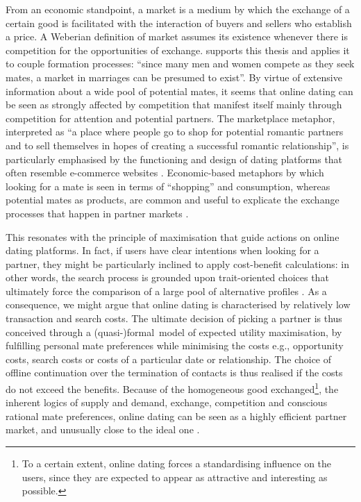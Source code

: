 From an economic standpoint, a market is a medium by which the exchange
of a certain good is facilitated with the interaction of buyers and
sellers who establish a price. A Weberian definition of market assumes
its existence whenever there is competition for the opportunities
of exchange. \citet{Becker1974A-Theory-of-Mar} supports this thesis
and applies it to couple formation processes: \textquotedblleft since
many men and women compete as they seek mates, a market in marriages
can be presumed to exist\textquotedblright . By virtue of extensive
information about a wide pool of potential mates, it seems that online
dating can be seen as strongly affected by competition that manifest
itself mainly through competition for attention and potential partners.
The marketplace metaphor, interpreted as \textquotedblleft a place
where people go to shop for potential romantic partners and to sell
themselves in hopes of creating a successful romantic relationship\textquotedblright ,
is particularly emphasised by the functioning and design of dating
platforms that often resemble e-commerce websites \citep{Heino2010Relationshoppin}.
Economic-based metaphors by which looking for a mate is seen in terms
of \textquotedblleft shopping\textquotedblright{} and consumption,
whereas potential mates as products, are common and useful to explicate
the exchange processes that happen in partner markets \citep{Bernard1990Market-Metaphor}.

This resonates with the principle of maximisation that guide actions
on online dating platforms. In fact, if users have clear intentions
when looking for a partner, they might be particularly inclined to
apply cost-benefit calculations: in other words, the search process
is grounded upon trait-oriented choices that ultimately force the
comparison of a large pool of alternative profiles \citep{Illouz2009An-Odd-and-Inse}.
As a consequence, we might argue that online dating is characterised
by relatively low transaction and search costs. The ultimate decision
of picking a partner is thus conceived through a \mbox{(quasi-)formal model}
of expected utility maximisation, by fulfilling personal mate preferences
while minimising the costs \textendash{} e.g., opportunity costs,
search costs or costs of a particular date or relationship. The choice
of offline continuation over the termination of contacts is thus realised
if the costs do not exceed the benefits. Because of the homogeneous
good exchanged\footnote{To a certain extent, online dating forces a standardising influence
on the users, since they are expected to appear as attractive and
interesting as possible. }, the inherent logics of supply and demand, exchange, competition
and conscious rational mate preferences, online dating can be seen
as a highly efficient partner market, and unusually close to the ideal
one \citep{Schmitz2016The-Structure-o}.


